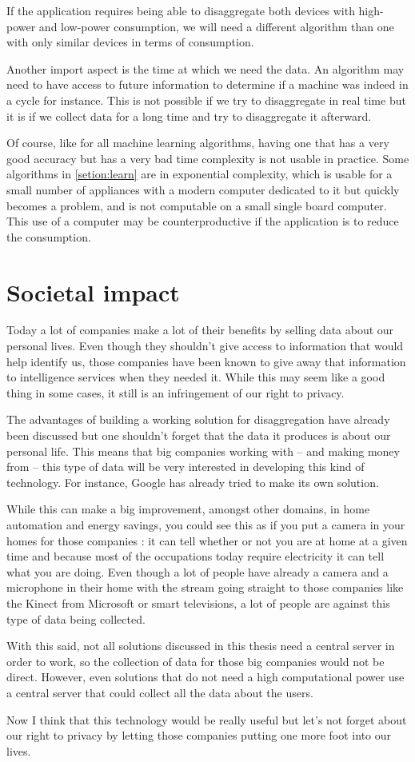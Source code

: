 If the application requires being able to disaggregate both devices with high-power and low-power consumption, we will need a different algorithm than one with only similar devices in terms of consumption.

Another import aspect is the time at which we need the data. An algorithm may need to have access to future information to determine if a machine was indeed in a cycle for instance. This is not possible if we try to disaggregate in real time but it is if we collect data for a long time and try to disaggregate it afterward.

Of course, like for all machine learning algorithms, having one that has a very good accuracy but has a very bad time complexity is not usable in practice. Some algorithms in \autoref{setion:learn} are in exponential complexity, which is usable for a small number of appliances with a modern computer dedicated to it but quickly becomes a problem, and is not computable on a small single board computer. This use of a computer may be counterproductive if the application is to reduce the consumption.


\section{Societal impact}
Today a lot of companies make a lot of their benefits by selling data about our personal lives. Even though they shouldn't give access to information that would help identify us, those companies have been known to give away that information to intelligence services when they needed it. While this may seem like a good thing in some cases, it still is an infringement of our right to privacy.

The advantages of building a working solution for disaggregation have already been discussed but one shouldn't forget that the data it produces is about our personal life. This means that big companies working with -- and making money from -- this type of data will be very interested in developing this kind of technology. For instance, Google has already tried to make its own solution. \cite{googleabandon} 

While this can make a big improvement, amongst other domains, in home automation and energy savings, you could see this as if you put a camera in your homes for those companies : it can tell whether or not you are at home at a given time and because most of the occupations today require electricity it can tell what you are doing. Even though a lot of people have already a camera and a microphone in their home with the stream going straight to those companies like the Kinect from Microsoft or smart televisions, a lot of people are against this type of data being collected.

With this said, not all solutions discussed in this thesis need a central server in order to work, so the collection of data for those big companies would not be direct. However, even solutions that do not need a high computational power use a central server that could collect all the data about the users. \cite{bruneel2018energy}

Now I think that this technology would be really useful but let's not forget about our right to privacy by letting those companies putting one more foot into our lives.
